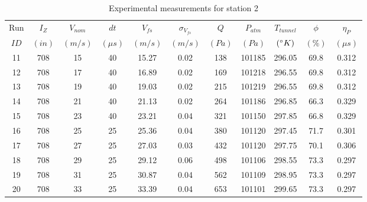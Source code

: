 \renewcommand\baselinestretch{1.3}\selectfont
\begin{table}[H]
\begin{center}
\begin{tabular}{|ccccccccccc|}
	\hline
	Run & $I_Z$ & $V_{nom}$ & $dt$ & $V_{fs}$ & $\sigma_{V_{fs}}$ & $Q$ & $P_{atm}$ & $T_{tunnel}$ & $\phi$ & $\eta_P$\\
	$ID$ & $(in)$ & $(m/s)$ & $(\mu s)$ & $(m/s)$ & $(m/s)$ & $(Pa)$ & $(Pa)$ & $(\degree K)$ & $(\%)$ & $(\mu s)$\\
	\hline
	11 & 708 & 15 & 40 & 15.27 & 0.02 & 138 & 101185 & 296.05 & 69.8 & 0.312\\
	12 & 708 & 17 & 40 & 16.89 & 0.02 & 169 & 101218 & 296.55 & 69.8 & 0.312\\
	13 & 708 & 19 & 40 & 19.03 & 0.02 & 215 & 101219 & 296.55 & 69.8 & 0.312\\
	14 & 708 & 21 & 40 & 21.13 & 0.02 & 264 & 101186 & 296.85 & 66.3 & 0.329\\
	15 & 708 & 23 & 40 & 23.21 & 0.04 & 321 & 101150 & 297.85 & 66.8 & 0.329\\
	16 & 708 & 25 & 25 & 25.36 & 0.04 & 380 & 101120 & 297.45 & 71.7 & 0.301\\
	17 & 708 & 27 & 25 & 27.03 & 0.03 & 432 & 101120 & 297.75 & 70.1 & 0.306\\
	18 & 708 & 29 & 25 & 29.12 & 0.06 & 498 & 101106 & 298.55 & 73.3 & 0.297\\
	19 & 708 & 31 & 25 & 30.87 & 0.04 & 562 & 101109 & 298.95 & 73.3 & 0.297\\
	20 & 708 & 33 & 25 & 33.39 & 0.04 & 653 & 101101 & 299.65 & 73.3 & 0.297\\
	\hline
\end{tabular}
\caption{Experimental measurements for station 2}
\label{table:station_2_measurements}
\end{center}
\end{table}
\renewcommand\baselinestretch{2}\selectfont
